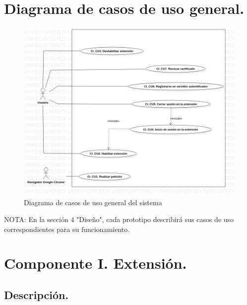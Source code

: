\documentclass[12pt, a4paper, titlepage]{report}
\begin{document}
	    \section{Diagrama de casos de uso general.}
	        \begin{figure}[H]
        		\begin{center}
        		\includegraphics[width=13cm]{./imagenes/Analisis/UCD_General.png}
        		\caption{Diagrama de casos de uso general del sistema}
	            \end{center}
            \end{figure}   
	        
	        NOTA: En la sección 4 "Diseño", cada prototipo describirá sus casos de uso correspondientes para su funcionamiento.
	
		
		\section{Componente I. Extensión.}
		    \subsection{Descripción.}
		    
\end{document}
